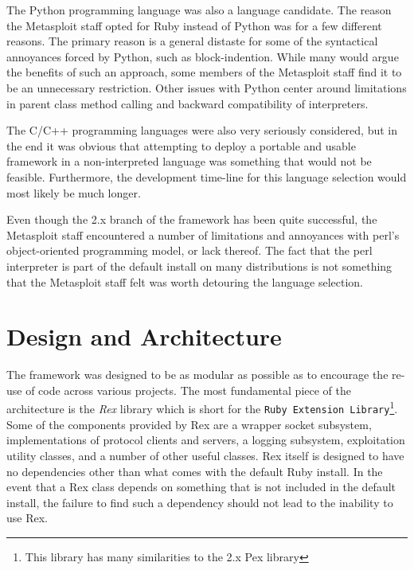 \documentclass{report}
\begin{document}
\par
The Python programming language was also a language candidate. The
reason the Metasploit staff opted for Ruby instead of Python was for
a few different reasons.  The primary reason is a general distaste
for some of the syntactical annoyances forced by Python, such as
block-indention.  While many would argue the benefits of such an
approach, some members of the Metasploit staff find it to be an
unnecessary restriction.  Other issues with Python center around
limitations in parent class method calling and backward
compatibility of interpreters.

\par
The C/C++ programming languages were also very seriously considered,
but in the end it was obvious that attempting to deploy a portable
and usable framework in a non-interpreted language was something
that would not be feasible.  Furthermore, the development time-line
for this language selection would most likely be much longer.

\par
Even though the 2.x branch of the framework has been quite
successful, the Metasploit staff encountered a number of limitations
and annoyances with perl's object-oriented programming model, or
lack thereof.  The fact that the perl interpreter is part of the
default install on many distributions is not something that the
Metasploit staff felt was worth detouring the language selection.

    \section{Design and Architecture}

\par
The framework was designed to be as modular as possible as to
encourage the re-use of code across various projects.  The most
fundamental piece of the architecture is the \textit{Rex} library
which is short for the \texttt{Ruby Extension Library}\footnote{This
library has many similarities to the 2.x Pex library}. Some of the
components provided by Rex are a wrapper socket subsystem,
implementations of protocol clients and servers, a logging
subsystem, exploitation utility classes, and a number of other
useful classes.  Rex itself is designed to have no dependencies
other than what comes with the default Ruby install. In the event
that a Rex class depends on something that is not included in the
default install, the failure to find such a dependency should not
lead to the inability to use Rex.
\end{document}
